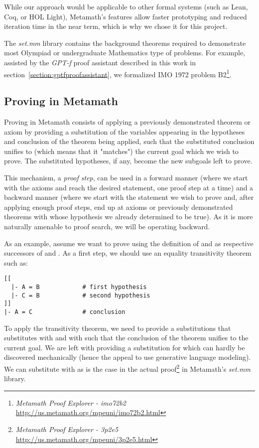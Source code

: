 \documentclass{article}
\begin{document}
While our approach would be applicable to other formal systems (such as Lean, Coq, or HOL Light), Metamath's features allow faster prototyping and reduced iteration time in the near term, which is why we chose it for this project.

The \textit{set.mm} library contains the background theorems required to demonstrate most Olympiad or undergraduate Mathematics type of problems. For example, assisted by the \emph{GPT-f} proof assistant described in this work in section~\ref{section:gptfproofassistant}, we formalized IMO 1972 problem B2\footnote{\textit{Metamath Proof Explorer - imo72b2} \url{http://us.metamath.org/mpeuni/imo72b2.html}}.

\subsection{Proving in Metamath}

Proving in Metamath consists of applying a previously demonstrated theorem or axiom by providing a substitution of the variables appearing in the hypotheses and conclusion of the theorem being applied, such that the substituted conclusion unifies to (which means that it "matches") the current goal which we wish to prove.  The substituted hypotheses, if any, become the new subgoals left to prove.

This mechanism, a \textit{proof step}, can be used in a forward manner (where we start with the axioms and reach the desired statement, one proof step at a time) and a backward manner (where we start with the statement we wish to prove and, after applying enough proof steps, end up at axioms or previously demonstrated theorems with whose hypothesis we already determined to be true). As it is more naturally amenable to proof search, we will be operating backward. 

As an example, assume we want to prove  using the definition of  and  as respective successors of  and . As a first step, we should use an equality transitivity theorem such as:

\begin{verbatim}
[[
  |- A = B            # first hypothesis
  |- C = B            # second hypothesis
]]
|- A = C              # conclusion
\end{verbatim}

To apply the transitivity theorem, we need to provide a substitutions that substitutes  with  and  with  such that the conclusion of the theorem unifies to the current goal. We are left with providing a substitution for  which can hardly be discovered mechanically (hence the appeal to use generative language modeling). We can substitute  with  as is the case in the actual proof\footnote{\textit{Metamath Proof Explorer - 3p2e5} \url{http://us.metamath.org/mpeuni/3p2e5.html}} in Metamath's \textit{set.mm} library.
\end{document}
